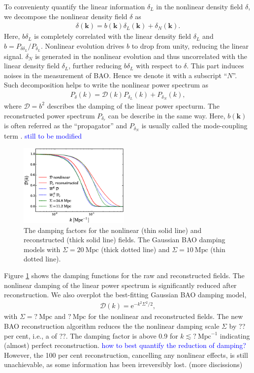 \documentclass[aps,prd,twocolumn,showpacs,superscriptaddress,groupedaddress,nofootinbib]{revtex4}  %
\newcommand{\mr}{\mathrm}
\newcommand{\tcb}{\textcolor{blue}}
\newcommand{\bea}{\begin{eqnarray}}
\newcommand{\eea}{\end{eqnarray}}
\begin{document}
To convenienty quantify the linear information $\delta_L$ in 
the nonlinear density field $\delta$, we decompose the nonlinear density field
$\delta$ as
\begin{eqnarray}
\delta(\bm{k})=b(\bm{k})\delta_L(\bm{k})+\delta_N(\bm{k}).
\end{eqnarray}
Here, $b\delta_L$ is completely correlated with the linear density field 
$\delta_L$ and $b=P_{\delta\delta_L}/P_{\delta_L}$.
Nonlinear evolution drives $b$ to drop from unity, reducing the linear signal.
$\delta_N$ is generated in the nonlinear evolution and thus uncorrelated with
the linear density field $\delta_L$, further reducing $b\delta_L$ with respect
to $\delta$. This part induces noises in the measurement of BAO. 
Hence we denote it with a subscript ``$N$''. 
Such decomposition helps to write the nonlinear power spectrum as
\bea
P_\delta(k)=\mathcal{D}(k)P_{\delta_L}(k)+P_{\delta_N}(k),
\eea
where $\mathcal{D}=b^2$ describes the damping of the linear power specturm.
The reconstructed power spectrum $P_{\delta_r}$ can be describe in the same way.
Here, $b(\bm{k})$ is often referred as the ``propagator'' 
and $P_{\delta_N}$ is usually
called the mode-coupling term \cite{2006crocce,2008crocce,2008matsubara}.
\tcb{still to be modified}

\begin{figure}[tbp]
\begin{center}
\includegraphics[width=0.48\textwidth]{f6x.eps}
\end{center}
\vspace{-0.7cm}
\caption{The damping factors for the nonlinear (thin solid line) and 
reconstructed (thick solid line) fields. The Gaussian BAO damping models with 
$\Sigma=20\ \mr{Mpc}$ (thick dotted line) and $\Sigma=10\ \mr{Mpc}$ (thin dotted
line).}
\label{fig:damp}
\end{figure}

Figure \ref{fig:damp} shows the damping functions for the raw and reconstructed 
fields. The nonlinear damping of the linear power spectrum is 
significantly reduced after reconstruction. We also overplot the best-fitting 
Gaussian BAO damping model,
\bea
\mathcal{D}(k)=\mr{e}^{-k^2\Sigma^2/2},
\eea
with $\Sigma=?\ \mr{Mpc}$ and $?\ \mr{Mpc}$ for the nonlinear and reconstructed 
fields. The new BAO reconstruction algorithm reduces the the nonlinear damping
scale $\Sigma$ by ?? per cent, i.e., a of ??. The damping factor is above 0.9
for $k\lesssim?\ \mr{Mpc}^{-1}$ indicating (almost) perfect reconstruction. 
\tcb{how to best quantify the reduction of damping? }
However, the 100 per cent reconstruction, cancelling any nonlinear effects,
is still unachievable, as some information has been irreversibly lost. (more 
discissions)
\end{document}
